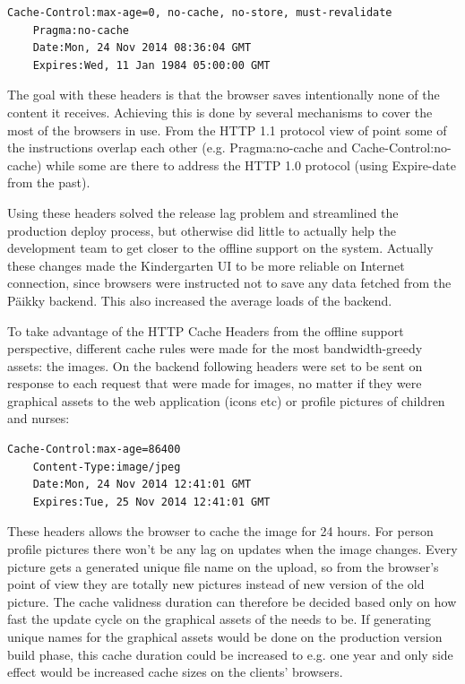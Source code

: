 \begin{lstlisting}[caption={Päikky HTTP Cache Headers},label={lst:cacheheader-1}]
    Cache-Control:max-age=0, no-cache, no-store, must-revalidate
    Pragma:no-cache
    Date:Mon, 24 Nov 2014 08:36:04 GMT
    Expires:Wed, 11 Jan 1984 05:00:00 GMT
\end{lstlisting}

\noindent The goal with these headers is that the browser saves intentionally none of the content it receives. Achieving this is done by several mechanisms to cover the most of the browsers in use. From the HTTP 1.1 protocol view of point some of the instructions overlap each other (e.g. Pragma:no-cache and Cache-Control:no-cache) while some are there to address the HTTP 1.0 protocol (using Expire-date from the past). \cite{fielding_et_al_hypertext_????}

Using these headers solved the release lag problem and streamlined the production deploy process, but otherwise did little to actually help the development team to get closer to the offline support on the system. Actually these changes made the Kindergarten UI to be more reliable on Internet connection, since browsers were instructed not to save any data fetched from the Päikky backend. This also increased the average loads of the backend.

To take advantage of the HTTP Cache Headers from the offline support perspective, different cache rules were made for the most bandwidth-greedy assets: the images. On the backend following headers were set to be sent on response to each request that were made for images, no matter if they were graphical assets to the web application (icons etc) or profile pictures of children and nurses:

\begin{lstlisting}[caption=Päikky HTTP Cache Headers for images]
    Cache-Control:max-age=86400
    Content-Type:image/jpeg
    Date:Mon, 24 Nov 2014 12:41:01 GMT
    Expires:Tue, 25 Nov 2014 12:41:01 GMT
\end{lstlisting}
\noindent These headers allows the browser to cache the image for 24 hours. For person profile pictures there won't be any lag on updates when the image changes. Every picture gets a generated unique file name on the upload, so from the browser's point of view they are totally new pictures instead of new version of the old picture. The cache validness duration can therefore be decided based only on how fast the update cycle on the graphical assets of the needs to be. If generating unique names for the graphical assets would be done on the production version build phase, this cache duration could be increased to e.g. one year and only side effect would be increased cache sizes on the clients' browsers.

